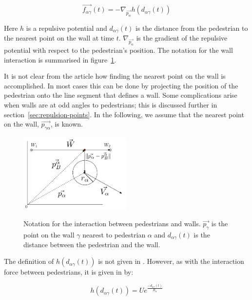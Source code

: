 \begin{equation}\label{wallpotential}
    \overrightarrow{f_{\alpha \gamma}}(t) =
    - \nabla_{\overrightarrow{p_{\alpha}}} h
    \left( d_{\alpha \gamma}(t) \right)
\end{equation}

Here $h$ is a repulsive potential and $d_{\alpha \gamma}(t)$ is the distance 
from the pedestrian to the nearest point on the wall at time $t$. 
$\nabla_{\overrightarrow{p_\alpha}}$ is the gradient of the repulsive 
potential with respect to the pedestrian's position. The notation for the wall 
interaction is summarised in figure~\ref{fig:wall-notation}.

It is not clear from the article how finding the nearest point on the wall is 
accomplished. In most cases this can be done by projecting the position of the 
pedestrian onto the line segment that defines a wall. Some complications 
arise when walls are at odd angles to pedestrians; this is discussed further 
in section~\ref{sec:repulsion-points}. In the following, we assume that the 
nearest point on the wall, $\overrightarrow{p_{\gamma \alpha}}$, is known.

\begin{figure}[ht]
    \centering
    {\includegraphics[width=0.5\textwidth]{Figures/NotationOfWall.pdf}} 
    \caption[Notation for the interaction between pedestrians and 
    walls]{Notation for the interaction between pedestrians and walls.  
    $\overrightarrow{p_\gamma}$ is the point on the wall $\gamma$ nearest to 
    pedestrian $\alpha$ and  $d_{\alpha \gamma}(t)$ is the distance between 
    the pedestrian and the wall.}
    \label{fig:wall-notation}
\end{figure}

The definition of $h\left( d_{\alpha \gamma}(t) \right)$ is not given in 
\cite{self-org}. However, as with the interaction force between pedestrians, 
it is given in \cite{ABconstant} by: 

\begin{equation}
    h \left( d_{\alpha \gamma}(t) \right) =
    U e^{\frac{- d_{\alpha \gamma}(t) }{ R_{\alpha} }}
\end{equation}

